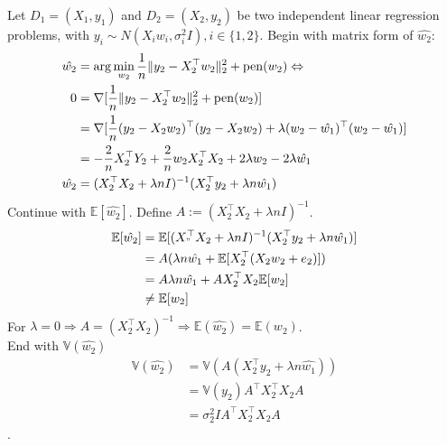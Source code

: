 Let $D_1 = (X_1, y_1)$ and $D_2 = (X_2, y_2)$ be two independent linear regression problems, with $y_i \sim N(X_i w_i, \sigma_i^2 I), i \in \{1,2\}$.
Begin with matrix form of $\hat{w_2}$:
\begin{equation}
	\begin{split}
		\hat{w_2} &= \arg\min_{w_2} \frac{1}{n}\lVert y_2 - X_2^\top w_2\rVert_2^2 + \operatorname{pen}(w_2)  \Leftrightarrow \\
		0 &= \nabla [\frac{1}{n}\lVert y_2 - X_2^\top w_2\rVert_2^2 + \operatorname{pen}(w_2)] \\
		&= \nabla [\frac{1}{n} (y_2 - X_2w_2)^\top (y_2 - X_2w_2) + \lambda(w_2 - \hat{w_1})^\top (w_2 - \hat{w_1})] \\
		&= -\frac{2}{n} X_2^\top Y_2 + \frac{2}{n} w_2X_2^\top X_2 + 2\lambda w_2 - 2\lambda \hat{w_1} \\
		\hat{w_2} &= (X_2^\top X_2+\lambda n I)^{-1}(X_2^\top y_2 +\lambda n \hat{w_1})
	\end{split}
\end{equation}
Continue with $\mathbb{E}[\hat{w_2}]$. Define $A := (X_2^\top X_2+\lambda n I)^{-1}$.
\begin{equation}
	\begin{split}
		\mathbb{E}[\hat{w_2}] &= \mathbb{E}[(X_"^\top X_2+\lambda n I)^{-1}(X_2^\top y_2 +\lambda n \hat{w_1})] \\
		&= A ( \lambda n \hat{w_1} + \mathbb{E}[X_2^\top(X_2 w_2 + e_2)] ) \\
		&= A \lambda n \hat{w_1} + A X_2^\top X_2 \mathbb{E}[w_2] \\
		&\neq \mathbb{E}[w_2]
	\end{split}
\end{equation}
For $\lambda  = 0 \Rightarrow A = (X_2^\top X_2)^{-1} \Rightarrow \mathbb{E}(\hat{w_2}) = \mathbb{E}(w_2)$.\\


End with $\mathbb{V}(\hat{w_2})$
\begin{equation}
	\begin{split}
		\mathbb{V}(\hat{w_2}) &= \mathbb{V}(A (X_2^\top y_2 + \lambda n \hat{w_1})) \\
		&= \mathbb{V}(y_2) A^\top X_2^\top X_2 A\\
		&= \sigma_2^2I A^\top X_2^\top X_2 A
	\end{split}
\end{equation}.
